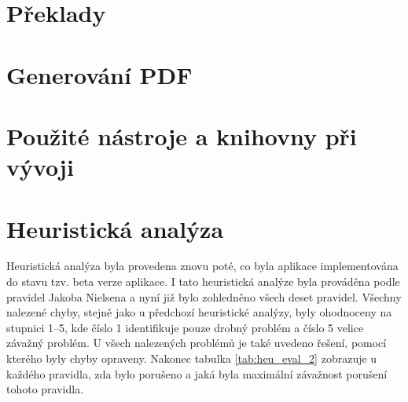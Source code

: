\documentclass[thesis=M,czech]{FITthesis}[2012/06/26]
\begin{document}
\section{Překlady}

\section{Generování PDF}

\section{Použité nástroje a knihovny při vývoji}

\section{Heuristická analýza}
Heuristická analýza byla provedena znovu poté, co byla aplikace implementována do stavu tzv. beta verze aplikace. I tato heuristická analýze byla prováděna podle pravidel Jakoba Nielsena a nyní již bylo zohledněno všech deset pravidel. Všechny nalezené chyby, stejně jako u předchozí heuristické analýzy, byly ohodnoceny na stupnici 1--5, kde číslo 1 identifikuje pouze drobný problém a číslo 5 velice závažný problém. U všech nalezených problémů je také uvedeno řešení, pomocí kterého byly chyby opraveny. Nakonec tabulka \ref{tab:heu_eval_2} zobrazuje u každého pravidla, zda bylo porušeno a jaká byla maximální závažnost porušení tohoto pravidla.
\end{document}
